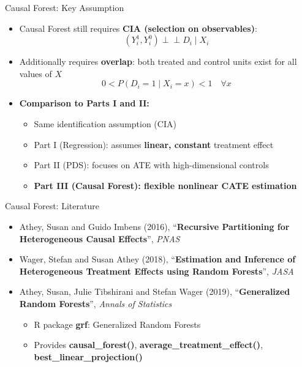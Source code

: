 \documentclass[hyperref={pdfpagelabels=false}]{beamer}
\newcommand{\indep}{\perp\!\!\!\perp}
\begin{document}
\begin{frame}{Causal Forest: Key Assumption}
	\begin{itemize}
		\item Causal Forest still requires \textbf{CIA (selection on observables)}:
		\begin{equation*}
			(Y^{1}_{i}, Y^{0}_{i}) \indep D_{i} \mid X_{i}
		\end{equation*}
		\vspace{0.2cm}
		\item Additionally requires \textbf{overlap}: both treated and control units exist for all values of $X$
		\begin{equation*}
			0 < P(D_i = 1 \mid X_i = x) < 1 \quad \forall x
		\end{equation*}
		\vspace{0.3cm}
		\item \textbf{Comparison to Parts I and II:}
		\vspace{0.2cm}
		\begin{itemize}
			\item Same identification assumption (CIA)
			\vspace{0.2cm}
			\item Part I (Regression): assumes \textbf{linear, constant} treatment effect
			\vspace{0.2cm}
			\item Part II (PDS): focuses on ATE with high-dimensional controls
			\vspace{0.2cm}
			\item \textbf{Part III (Causal Forest): flexible nonlinear CATE estimation}
		\end{itemize}
	\end{itemize}
\end{frame}




\begin{frame}{Causal Forest: Literature}
	\begin{itemize}
		\item[] Athey, Susan and Guido Imbens (2016), ``\textbf{Recursive Partitioning for Heterogeneous Causal Effects}'', \textit{PNAS}
		\vspace{0.2cm}
		\item[] Wager, Stefan and Susan Athey (2018), ``\textbf{Estimation and Inference of Heterogeneous Treatment Effects using Random Forests}'', \textit{JASA}
		\vspace{0.2cm}
		\item[] Athey, Susan, Julie Tibshirani and Stefan Wager (2019), ``\textbf{Generalized Random Forests}'', \textit{Annals of Statistics}
		\vspace{0.2cm}
		\begin{itemize}
			\item R package \textbf{grf}: Generalized Random Forests
			\vspace{0.2cm}
			\item Provides \textbf{causal\_forest()}, \textbf{average\_treatment\_effect()}, \textbf{best\_linear\_projection()}
		\end{itemize}
	\end{itemize}
\end{frame}
\end{document}
